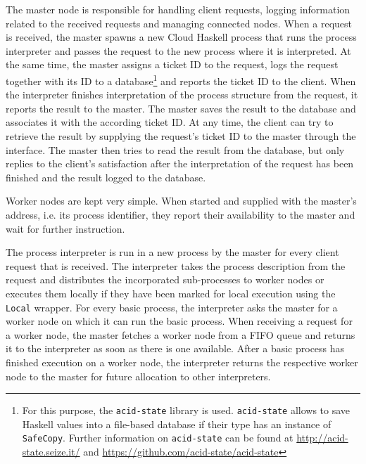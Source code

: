 The master node is responsible for handling client requests, logging information related to the received requests and managing connected nodes. When a request is received, the master spawns a new \textsf{Cloud Haskell} process that runs the process interpreter and passes the request to the new process where it is interpreted. At the same time, the master assigns a ticket ID to the request, logs the request together with its ID to a database\footnote{For this purpose, the \texttt{acid-state} library is used. \texttt{acid-state} allows to save \textsf{Haskell} values into a file-based database if their type has an instance of \texttt{SafeCopy}. Further information on \texttt{acid-state} can be found at \url{http://acid-state.seize.it/} and \url{https://github.com/acid-state/acid-state}} and reports the ticket ID to the client. When the interpreter finishes interpretation of the process structure from the request, it reports the result to the master. The master saves the result to the database and associates it with the according ticket ID. At any time, the client can try to retrieve the result by supplying the request's ticket ID to the master through the interface. The master then tries to read the result from the database, but only replies to the client's satisfaction after the interpretation of the request has been finished and the result logged to the database.

Worker nodes are kept very simple. When started and supplied with the master's address, i.e. its process identifier, they report their availability to the master and wait for further instruction.

The process interpreter is run in a new process by the master for every client request that is received. The interpreter takes the process description from the request and distributes the incorporated sub-processes to worker nodes or executes them locally if they have been marked for local execution using the \texttt{Local} wrapper. For every basic process, the interpreter asks the master for a worker node on which it can run the basic process. When receiving a request for a worker node, the master fetches a worker node from a FIFO queue and returns it to the interpreter as soon as there is one available. After a basic process has finished execution on a worker node, the interpreter returns the respective worker node to the master for future allocation to other interpreters.


